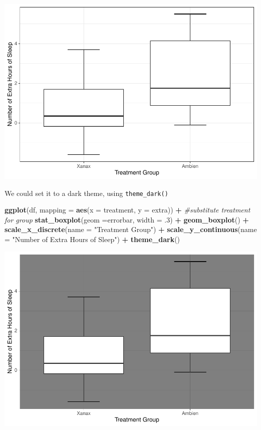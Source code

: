 \documentclass[
]{book}
\newenvironment{Shaded}{\begin{snugshade}}{\end{snugshade}}
\newcommand{\AttributeTok}[1]{\textcolor[rgb]{0.13,0.29,0.53}{#1}}
\newcommand{\CommentTok}[1]{\textcolor[rgb]{0.56,0.35,0.01}{\textit{#1}}}
\newcommand{\DecValTok}[1]{\textcolor[rgb]{0.00,0.00,0.81}{#1}}
\newcommand{\FunctionTok}[1]{\textcolor[rgb]{0.13,0.29,0.53}{\textbf{#1}}}
\newcommand{\NormalTok}[1]{#1}
\newcommand{\SpecialCharTok}[1]{\textcolor[rgb]{0.81,0.36,0.00}{\textbf{#1}}}
\newcommand{\StringTok}[1]{\textcolor[rgb]{0.31,0.60,0.02}{#1}}
\begin{document}
\includegraphics{rintro_demo_files/figure-latex/unnamed-chunk-288-1.pdf}

We could set it to a dark theme, using \texttt{theme\_dark()}

\begin{Shaded}
\begin{Highlighting}[]
\FunctionTok{ggplot}\NormalTok{(df, }\AttributeTok{mapping =} \FunctionTok{aes}\NormalTok{(}\AttributeTok{x =}\NormalTok{ treatment, }\AttributeTok{y =}\NormalTok{ extra)) }\SpecialCharTok{+} \CommentTok{\#substitute treatment for group}
  \FunctionTok{stat\_boxplot}\NormalTok{(}\AttributeTok{geom =}\StringTok{\textquotesingle{}errorbar\textquotesingle{}}\NormalTok{, }\AttributeTok{width =}\NormalTok{ .}\DecValTok{3}\NormalTok{) }\SpecialCharTok{+}
  \FunctionTok{geom\_boxplot}\NormalTok{() }\SpecialCharTok{+} 
  \FunctionTok{scale\_x\_discrete}\NormalTok{(}\AttributeTok{name =} \StringTok{"Treatment Group"}\NormalTok{) }\SpecialCharTok{+} 
  \FunctionTok{scale\_y\_continuous}\NormalTok{(}\AttributeTok{name =} \StringTok{"Number of Extra Hours of Sleep"}\NormalTok{) }\SpecialCharTok{+}
  \FunctionTok{theme\_dark}\NormalTok{()}
\end{Highlighting}
\end{Shaded}

\includegraphics{rintro_demo_files/figure-latex/unnamed-chunk-289-1.pdf}
\end{document}

